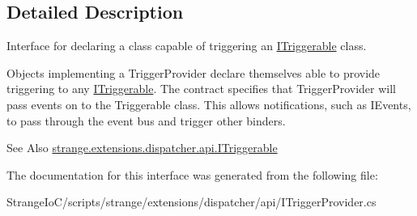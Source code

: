\subsection{Detailed Description}
Interface for declaring a class capable of triggering an \hyperlink{interfacestrange_1_1extensions_1_1dispatcher_1_1api_1_1_i_triggerable}{I\-Triggerable} class. 

Objects implementing a Trigger\-Provider declare themselves able to provide triggering to any \hyperlink{interfacestrange_1_1extensions_1_1dispatcher_1_1api_1_1_i_triggerable}{I\-Triggerable}. The contract specifies that Trigger\-Provider will pass events on to the Triggerable class. This allows notifications, such as I\-Events, to pass through the event bus and trigger other binders.

\begin{DoxySeeAlso}{See Also}
\hyperlink{interfacestrange_1_1extensions_1_1dispatcher_1_1api_1_1_i_triggerable}{strange.\-extensions.\-dispatcher.\-api.\-I\-Triggerable} 
\end{DoxySeeAlso}


The documentation for this interface was generated from the following file\-:\begin{DoxyCompactItemize}
\item 
Strange\-Io\-C/scripts/strange/extensions/dispatcher/api/I\-Trigger\-Provider.\-cs\end{DoxyCompactItemize}
